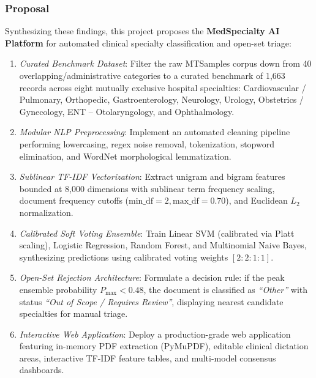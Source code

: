 \subsubsection{Proposal}
Synthesizing these findings, this project proposes the \textbf{MedSpecialty AI Platform} for automated clinical specialty classification and open-set triage:
\begin{enumerate}
    \item \textit{Curated Benchmark Dataset}: Filter the raw MTSamples corpus down from 40 overlapping/administrative categories to a curated benchmark of 1,663 records across eight mutually exclusive hospital specialties: Cardiovascular / Pulmonary, Orthopedic, Gastroenterology, Neurology, Urology, Obstetrics / Gynecology, ENT -- Otolaryngology, and Ophthalmology.
    \item \textit{Modular NLP Preprocessing}: Implement an automated cleaning pipeline performing lowercasing, regex noise removal, tokenization, stopword elimination, and WordNet morphological lemmatization.
    \item \textit{Sublinear TF-IDF Vectorization}: Extract unigram and bigram features bounded at 8,000 dimensions with sublinear term frequency scaling, document frequency cutoffs ($\text{min\_df}=2, \text{max\_df}=0.70$), and Euclidean $L_2$ normalization.
    \item \textit{Calibrated Soft Voting Ensemble}: Train Linear SVM (calibrated via Platt scaling), Logistic Regression, Random Forest, and Multinomial Naive Bayes, synthesizing predictions using calibrated voting weights $[2 : 2 : 1 : 1]$.
    \item \textit{Open-Set Rejection Architecture}: Formulate a decision rule: if the peak ensemble probability $P_{\max} < 0.48$, the document is classified as \textit{``Other''} with status \textit{``Out of Scope / Requires Review''}, displaying nearest candidate specialties for manual triage.
    \item \textit{Interactive Web Application}: Deploy a production-grade web application featuring in-memory PDF extraction (PyMuPDF), editable clinical dictation areas, interactive TF-IDF feature tables, and multi-model consensus dashboards.
\end{enumerate}

